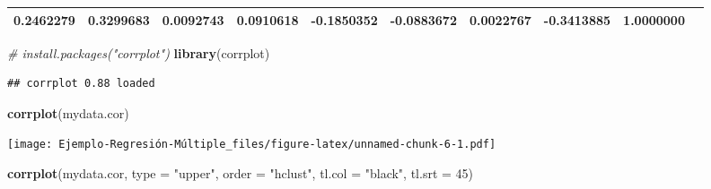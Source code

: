 \documentclass[]{article}
\newenvironment{Shaded}{\begin{snugshade}}{\end{snugshade}}
\newcommand{\KeywordTok}[1]{\textcolor[rgb]{0.13,0.29,0.53}{\textbf{#1}}}
\newcommand{\DataTypeTok}[1]{\textcolor[rgb]{0.13,0.29,0.53}{#1}}
\newcommand{\DecValTok}[1]{\textcolor[rgb]{0.00,0.00,0.81}{#1}}
\newcommand{\StringTok}[1]{\textcolor[rgb]{0.31,0.60,0.02}{#1}}
\newcommand{\CommentTok}[1]{\textcolor[rgb]{0.56,0.35,0.01}{\textit{#1}}}
\newcommand{\NormalTok}[1]{#1}
\begin{document}
\begin{longtable}[]{@{}lrrrrrrrrr@{}}
\begin{minipage}[t]{0.07\columnwidth}
0.2462279\strut
\end{minipage} & \begin{minipage}[t]{0.07\columnwidth}\raggedleft\strut
0.3299683\strut
\end{minipage} & \begin{minipage}[t]{0.09\columnwidth}\raggedleft\strut
0.0092743\strut
\end{minipage} & \begin{minipage}[t]{0.07\columnwidth}\raggedleft\strut
0.0910618\strut
\end{minipage} & \begin{minipage}[t]{0.07\columnwidth}\raggedleft\strut
-0.1850352\strut
\end{minipage} & \begin{minipage}[t]{0.07\columnwidth}\raggedleft\strut
-0.0883672\strut
\end{minipage} & \begin{minipage}[t]{0.07\columnwidth}\raggedleft\strut
0.0022767\strut
\end{minipage} & \begin{minipage}[t]{0.07\columnwidth}\raggedleft\strut
-0.3413885\strut
\end{minipage} & \begin{minipage}[t]{0.09\columnwidth}\raggedleft\strut
1.0000000\strut
\end{minipage}\tabularnewline
\bottomrule
\end{longtable}

\begin{Shaded}
\begin{Highlighting}[]
\CommentTok{# install.packages("corrplot")}
\KeywordTok{library}\NormalTok{(corrplot)}
\end{Highlighting}
\end{Shaded}

\begin{verbatim}
## corrplot 0.88 loaded
\end{verbatim}

\begin{Shaded}
\begin{Highlighting}[]
\KeywordTok{corrplot}\NormalTok{(mydata.cor)}
\end{Highlighting}
\end{Shaded}

\texttt{[image: Ejemplo-Regresión-Múltiple\_files/figure-latex/unnamed-chunk-6-1.pdf]}

\begin{Shaded}
\begin{Highlighting}[]
\KeywordTok{corrplot}\NormalTok{(mydata.cor, }\DataTypeTok{type =} \StringTok{"upper"}\NormalTok{, }\DataTypeTok{order =} \StringTok{"hclust"}\NormalTok{, }\DataTypeTok{tl.col =} \StringTok{"black"}\NormalTok{, }\DataTypeTok{tl.srt =} \DecValTok{45}\NormalTok{)}
\end{Highlighting}
\end{Shaded}
\end{document}
